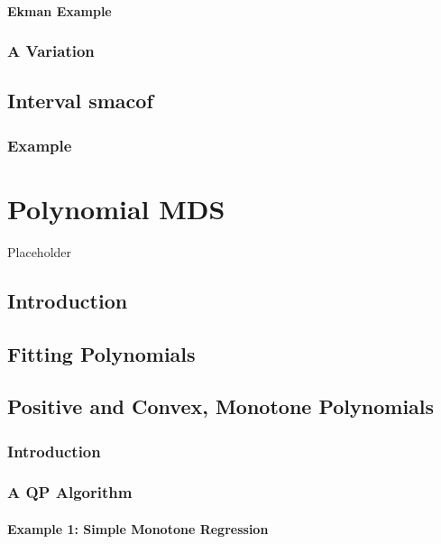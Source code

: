\documentclass[
  12pt,
]{book}
\begin{document}
\subsubsection{Ekman Example}\label{ekman-example}

\subsection{A Variation}\label{variation}

\section{Interval smacof}\label{interval-smacof}

\subsection{Example}\label{example}

\chapter{Polynomial MDS}\label{polynomial-mds}

Placeholder

\section{Introduction}\label{introduction}

\section{Fitting Polynomials}\label{fitting-polynomials}

\section{Positive and Convex, Monotone Polynomials}\label{positive-and-convex-monotone-polynomials}

\subsection{Introduction}\label{introduction-1}

\subsection{A QP Algorithm}\label{a-qp-algorithm}

\subsubsection{Example 1: Simple Monotone Regression}\label{example-1-simple-monotone-regression}
\end{document}
